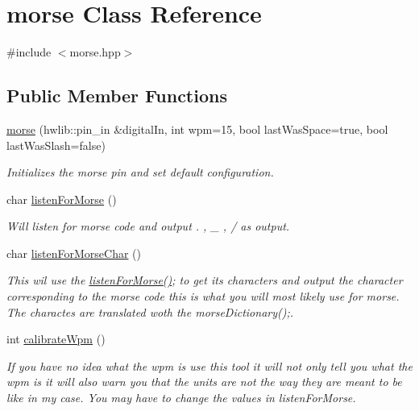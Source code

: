 \hypertarget{classmorse}{}\section{morse Class Reference}
\label{classmorse}


{\ttfamily \#include $<$morse.\+hpp$>$}

\subsection*{Public Member Functions}
\begin{DoxyCompactItemize}
\item 
\hyperlink{classmorse_a8a972ad05a82519e2dfeb9c189c3a5c1}{morse} (hwlib\+::pin\+\_\+in \&digital\+In, int wpm=15, bool last\+Was\+Space=true, bool last\+Was\+Slash=false)
\begin{DoxyCompactList}\small\item\em Initializes the morse pin and set default configuration. \end{DoxyCompactList}\item 
char \hyperlink{classmorse_a9d0fad692247122d0ec3c17af1244924}{listen\+For\+Morse} ()
\begin{DoxyCompactList}\small\item\em Will listen for morse code and output . , \+\_\+ , / as output. \end{DoxyCompactList}\item 
\mbox{\label{classmorse_a39663cf1eabc1a6d1cb6d40487c95bd9}} 
char \hyperlink{classmorse_a39663cf1eabc1a6d1cb6d40487c95bd9}{listen\+For\+Morse\+Char} ()
\begin{DoxyCompactList}\small\item\em This wil use the \hyperlink{classmorse_a9d0fad692247122d0ec3c17af1244924}{listen\+For\+Morse()}; to get it\textquotesingle{}s characters and output the character corresponding to the morse code this is what you will most likely use for morse. The charactes are translated woth the morse\+Dictionary();. \end{DoxyCompactList}\item 
int \hyperlink{classmorse_ad4da7cb937ff264bb0b27d7cb13b5207}{calibrate\+Wpm} ()
\begin{DoxyCompactList}\small\item\em If you have no idea what the wpm is use this tool it will not only tell you what the wpm is it will also warn you that the units are not the way they are meant to be like in my case. You may have to change the values in listen\+For\+Morse. \end{DoxyCompactList}\item 

\end{DoxyCompactItemize}
